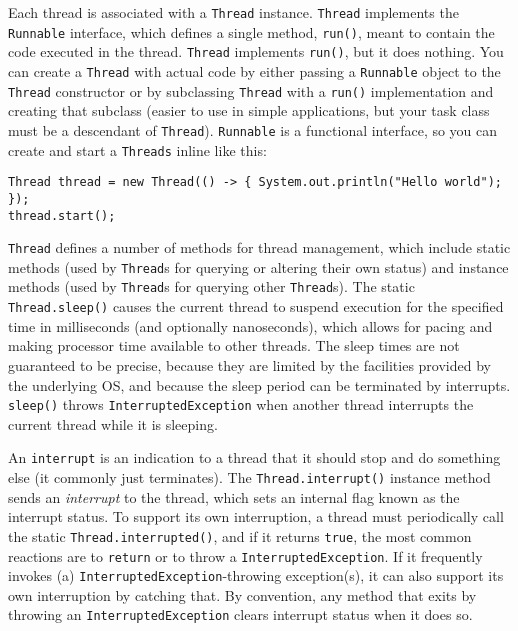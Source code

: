 \documentclass[8pt, table, xcdraw]{article}%
\begin{document}
Each thread is associated with a \lstinline{Thread} instance. \lstinline{Thread} implements the \lstinline{Runnable} interface, which defines a single method, \lstinline{run()}, meant to contain the code executed in the thread. \lstinline{Thread} implements \lstinline{run()}, but it does nothing. You can create a \lstinline{Thread} with actual code by either passing a \lstinline{Runnable} object to the \lstinline{Thread} constructor or by subclassing \lstinline{Thread} with a \lstinline{run()} implementation and creating that subclass (easier to use in simple applications, but your task class must be a descendant of \lstinline{Thread}). \lstinline{Runnable} is a functional interface, so you can create and start a \lstinline{Threads} inline like this:

\begin{lstlisting}
Thread thread = new Thread(() -> { System.out.println("Hello world"); });
thread.start();
\end{lstlisting}

\lstinline{Thread} defines a number of methods for thread management, which include static methods (used by \lstinline{Thread}s for querying or altering their own status) and instance methods (used by \lstinline{Thread}s for querying other \lstinline{Thread}s). The static \lstinline{Thread.sleep()} causes the current thread to suspend execution for the specified time in milliseconds (and optionally nanoseconds), which allows for pacing and making processor time available to other threads. The sleep times are not guaranteed to be precise, because they are limited by the facilities provided by the underlying OS, and because the sleep period can be terminated by interrupts. \lstinline{sleep()} throws \lstinline{InterruptedException} when another thread interrupts the current thread while it is sleeping.

An \lstinline{interrupt} is an indication to a thread that it should stop and do something else (it commonly just terminates). The \lstinline{Thread.interrupt()} instance method sends an \emph{interrupt} to the thread, which sets an internal flag known as the interrupt status. To support its own interruption, a thread must periodically call the static \lstinline{Thread.interrupted()}, and if it returns \lstinline{true}, the most common reactions are to \lstinline{return} or to throw a \lstinline{InterruptedException}. If it frequently invokes (a) \lstinline{InterruptedException}-throwing exception(s), it can also support its own interruption by catching that. By convention, any method that exits by throwing an \lstinline{InterruptedException} clears interrupt status when it does so.
\end{document}
